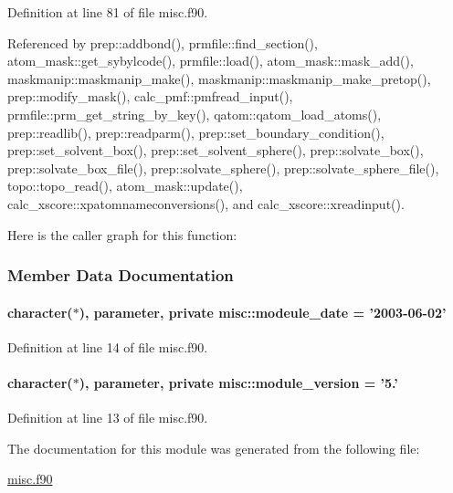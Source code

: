 Definition at line 81 of file misc.\-f90.



Referenced by prep\-::addbond(), prmfile\-::find\-\_\-section(), atom\-\_\-mask\-::get\-\_\-sybylcode(), prmfile\-::load(), atom\-\_\-mask\-::mask\-\_\-add(), maskmanip\-::maskmanip\-\_\-make(), maskmanip\-::maskmanip\-\_\-make\-\_\-pretop(), prep\-::modify\-\_\-mask(), calc\-\_\-pmf\-::pmfread\-\_\-input(), prmfile\-::prm\-\_\-get\-\_\-string\-\_\-by\-\_\-key(), qatom\-::qatom\-\_\-load\-\_\-atoms(), prep\-::readlib(), prep\-::readparm(), prep\-::set\-\_\-boundary\-\_\-condition(), prep\-::set\-\_\-solvent\-\_\-box(), prep\-::set\-\_\-solvent\-\_\-sphere(), prep\-::solvate\-\_\-box(), prep\-::solvate\-\_\-box\-\_\-file(), prep\-::solvate\-\_\-sphere(), prep\-::solvate\-\_\-sphere\-\_\-file(), topo\-::topo\-\_\-read(), atom\-\_\-mask\-::update(), calc\-\_\-xscore\-::xpatomnameconversions(), and calc\-\_\-xscore\-::xreadinput().



Here is the caller graph for this function\-:




\subsubsection{Member Data Documentation}
\hypertarget{classmisc_ad45c52c02a8474df0422e2b0046e2d54}{
\paragraph[{modeule\-\_\-date}]{\setlength{\rightskip}{0pt plus 5cm}character($\ast$), parameter, private misc\-::modeule\-\_\-date = '2003-\/06-\/02'\hspace{0.3cm}{\ttfamily [private]}}}\label{classmisc_ad45c52c02a8474df0422e2b0046e2d54}


Definition at line 14 of file misc.\-f90.

\hypertarget{classmisc_a6c9481cfaef19b644899abcb7651f9a4}{
\paragraph[{module\-\_\-version}]{\setlength{\rightskip}{0pt plus 5cm}character($\ast$), parameter, private misc\-::module\-\_\-version = '5.'\hspace{0.3cm}{\ttfamily [private]}}}\label{classmisc_a6c9481cfaef19b644899abcb7651f9a4}


Definition at line 13 of file misc.\-f90.



The documentation for this module was generated from the following file\-:\begin{DoxyCompactItemize}
\item 
\hyperlink{misc_8f90}{misc.\-f90}\end{DoxyCompactItemize}
